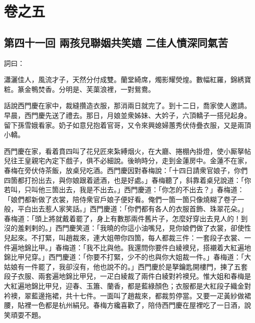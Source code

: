 \part*{{\titlename}卷之五}



\chapter*{第四十一回 兩孩兒聯姻共笑嬉 二佳人憤深同氣苦}


詞曰：

\begin{myquote}
瀟灑佳人，風流才子，天然分付成雙。蘭堂綺席，燭影耀熒煌。數幅紅羅，錦綉寶粧。篆金鴨焚香。分明是、芙蕖浪裡，一對鴛鴦。

\end{myquote}

話說西門慶在家中，裁縫攢造衣服，那消兩日就完了。到十二日，喬家使人邀請。早晨，西門慶先送了禮去。那日，月娘並衆姊妹、大妗子，六頂轎子一搭兒起身。留下孫雪娥看家。奶子如意兒抱着官哥，又令來興媳婦蕙秀伏侍疊衣服，又是兩頂小轎。

西門慶在家，看着賁四叫了花兒匠來紮縛烟火，在大廳、捲棚內掛燈，使小厮拏帖兒往王皇親宅內定下戲子，俱不必細說。後晌時分，走到金蓮房中。金蓮不在家，春梅在旁伏侍茶飯，放桌兒吃酒。西門慶因對春梅說：「十四日請衆官娘子，你們四箇都打扮出去，與你娘跟着遞酒，也是好處。」春梅聽了，斜靠着桌兒說道：「你若叫，只叫他三箇出去，我是不出去。」西門慶道：「你怎的不出去？」春梅道：「娘們都新做了衣裳，陪侍衆官戶娘子便好看。俺們一箇一箇只像燒糊了卷子一般，平白出去惹人家笑話。」西門慶道：「你們都有各人的衣服首飾、珠翠花朵。」春梅道：「頭上將就戴着罷了，身上有數那兩件舊片子，怎麼好穿出去見人的！到沒的羞剌剌的。」西門慶笑道：「我曉的你這小油嘴兒，見你娘們做了衣裳，卻使性兒起來。不打緊，叫趙裁來，連大姐帶你四箇，每人都裁三件：一套段子衣裳、一件遍地錦比甲。」春梅道：「我不比與他。我還問你要件白綾襖兒，搭襯着大紅遍地錦比甲兒穿。」{}西門慶道：「你要不打緊，少不的也與你大姐裁一件。」春梅道：「大姑娘有一件罷了，我卻沒有，他也說不的。」西門慶於是拏鑰匙開樓門，揀了五套段子衣服、兩套遍地錦比甲兒，一疋白綾裁了兩件白綾對衿襖兒。惟大姐和春梅是大紅遍地錦比甲兒，迎春、玉簫、蘭香，都是藍綠顏色；衣服都是大紅段子織金對衿襖，翠藍邊拖裙，共十七件。一面叫了趙裁來，都裁剪停當。又要一疋黃紗做裙腰，貼裡一色都是杭州絹兒。春梅方纔喜歡了，陪侍西門慶在屋裡吃了一日酒，說笑頑耍不題。

